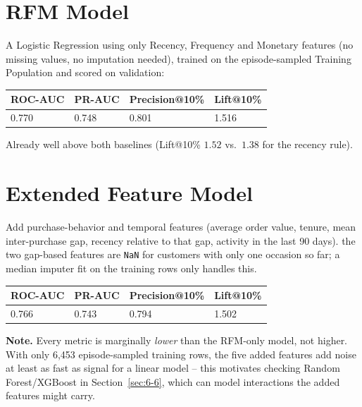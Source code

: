 \section{RFM Model}
\label{sec:6-3}

A Logistic Regression using only Recency, Frequency and Monetary features (no missing values, no imputation needed), trained on the episode-sampled Training Population and scored on validation:

\begin{center}
\begin{tabular}{@{}p{1.8cm}p{1.8cm}p{2.4cm}p{1.8cm}@{}}
    \toprule
    ROC-AUC & PR-AUC & Precision@10\% & Lift@10\% \\
    \midrule
    0.770 & 0.748 & 0.801 & 1.516 \\
    \bottomrule
\end{tabular}
\end{center}

Already well above both baselines (Lift@10\% $1.52$ vs.\ $1.38$ for the recency rule).

\section{Extended Feature Model}
\label{sec:6-4}

Add purchase-behavior and temporal features (average order value, tenure, mean inter-purchase gap, recency relative to that gap, activity in the last 90 days). the two gap-based features are \texttt{NaN} for customers with only one occasion so far; a median imputer fit on the training rows only handles this.

\begin{center}
\begin{tabular}{@{}p{1.8cm}p{1.8cm}p{2.4cm}p{1.8cm}@{}}
    \toprule
    ROC-AUC & PR-AUC & Precision@10\% & Lift@10\% \\
    \midrule
    0.766 & 0.743 & 0.794 & 1.502 \\
    \bottomrule
\end{tabular}
\end{center}

\textbf{Note.} Every metric is marginally \emph{lower} than the RFM-only model, not higher. With only 6,453 episode-sampled training rows, the five added features add noise at least as fast as signal for a linear model -- this motivates checking Random Forest/XGBoost in Section~\ref{sec:6-6}, which can model interactions the added features might carry.

